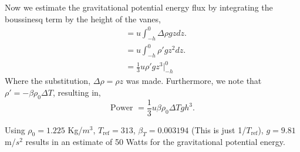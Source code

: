 \documentclass{article}
\begin{document}
Now we estimate the gravitational potential energy flux by integrating 
the boussinesq term by the height of the vanes, 
\begin{align*}
  & = u \int_{-h}^0 \Delta \rho g z dz. \\
  & = u \int_{-h}^0 \rho' g z^2 dz. \\
  & = \frac{1}{3} u \rho' g z^3 \bigg|_{-h}^{0}
\end{align*}
Where the substitution, $\Delta \rho = \rho z$ was made. Furthermore, we
note that $\rho' = -\beta \rho_0 \Delta T$, resulting in, 
%
%
\begin{equation}
 \text{Power } = \frac{1}{3} u \beta \rho_0 \Delta T g h^3.
\end{equation}

Using $\rho_0 = 1.225$ Kg/$m^3$, $T_{\text{ref}}=313$, $\beta_T = 0.003194$
(This is just 1/$T_{\text{ref}}$), $g=9.81$ m/$s^2$ results in an
estimate of 50 Watts for the gravitational potential energy. 

%
%

\end{document}
